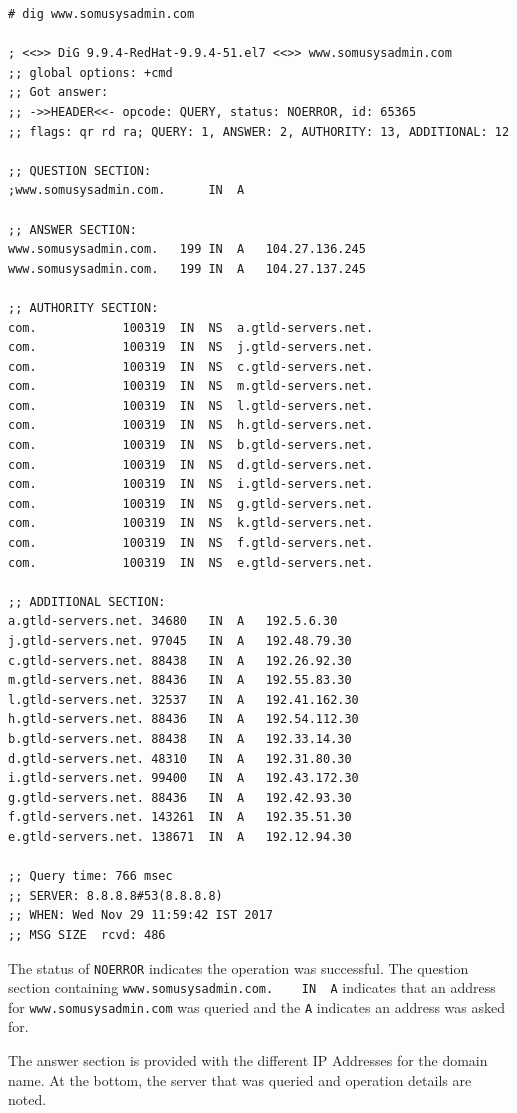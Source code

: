 \vspace{-15pt}
\begin{verbatim}
# dig www.somusysadmin.com

; <<>> DiG 9.9.4-RedHat-9.9.4-51.el7 <<>> www.somusysadmin.com
;; global options: +cmd
;; Got answer:
;; ->>HEADER<<- opcode: QUERY, status: NOERROR, id: 65365
;; flags: qr rd ra; QUERY: 1, ANSWER: 2, AUTHORITY: 13, ADDITIONAL: 12

;; QUESTION SECTION:
;www.somusysadmin.com.		IN	A

;; ANSWER SECTION:
www.somusysadmin.com.	199	IN	A	104.27.136.245
www.somusysadmin.com.	199	IN	A	104.27.137.245

;; AUTHORITY SECTION:
com.			100319	IN	NS	a.gtld-servers.net.
com.			100319	IN	NS	j.gtld-servers.net.
com.			100319	IN	NS	c.gtld-servers.net.
com.			100319	IN	NS	m.gtld-servers.net.
com.			100319	IN	NS	l.gtld-servers.net.
com.			100319	IN	NS	h.gtld-servers.net.
com.			100319	IN	NS	b.gtld-servers.net.
com.			100319	IN	NS	d.gtld-servers.net.
com.			100319	IN	NS	i.gtld-servers.net.
com.			100319	IN	NS	g.gtld-servers.net.
com.			100319	IN	NS	k.gtld-servers.net.
com.			100319	IN	NS	f.gtld-servers.net.
com.			100319	IN	NS	e.gtld-servers.net.

;; ADDITIONAL SECTION:
a.gtld-servers.net.	34680	IN	A	192.5.6.30
j.gtld-servers.net.	97045	IN	A	192.48.79.30
c.gtld-servers.net.	88438	IN	A	192.26.92.30
m.gtld-servers.net.	88436	IN	A	192.55.83.30
l.gtld-servers.net.	32537	IN	A	192.41.162.30
h.gtld-servers.net.	88436	IN	A	192.54.112.30
b.gtld-servers.net.	88438	IN	A	192.33.14.30
d.gtld-servers.net.	48310	IN	A	192.31.80.30
i.gtld-servers.net.	99400	IN	A	192.43.172.30
g.gtld-servers.net.	88436	IN	A	192.42.93.30
f.gtld-servers.net.	143261	IN	A	192.35.51.30
e.gtld-servers.net.	138671	IN	A	192.12.94.30

;; Query time: 766 msec
;; SERVER: 8.8.8.8#53(8.8.8.8)
;; WHEN: Wed Nov 29 11:59:42 IST 2017
;; MSG SIZE  rcvd: 486
\end{verbatim}
\vspace{-10pt}

\noindent
The status of \verb|NOERROR| indicates the operation was successful. The question section containing \verb|www.somusysadmin.com.	IN	A| indicates that an address for \verb|www.somusysadmin.com| was queried and the \verb|A| indicates an address was asked for. 

The answer section is provided with the different IP Addresses for the domain name. At the bottom, the server that was queried and operation details are noted.

